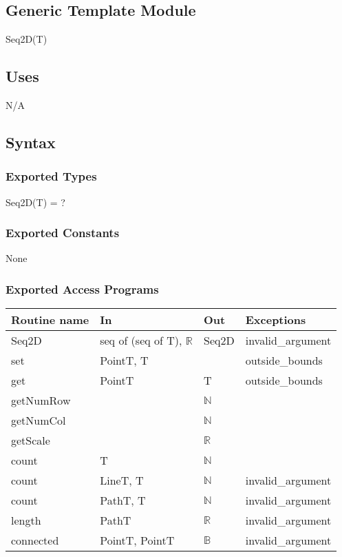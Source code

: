 \documentclass[12pt]{article}
\begin{document}
\subsection* {Generic Template Module}

Seq2D(T)

\subsection* {Uses}

N/A

\subsection* {Syntax}

\subsubsection* {Exported Types}

Seq2D(T) = ?

\subsubsection* {Exported Constants}

None

\subsubsection* {Exported Access Programs}

\begin{tabular}{| l | l | l | p{5cm} |}
\hline
\textbf{Routine name} & \textbf{In} & \textbf{Out} & \textbf{Exceptions}\\
\hline
Seq2D & seq of (seq of T), $\mathbb{R}$ & Seq2D & invalid\_argument\\
\hline
set & PointT, T & ~ & outside\_bounds\\
\hline
get & PointT & T & outside\_bounds\\
\hline
getNumRow & ~ & $\mathbb{N}$ & \\
\hline
getNumCol & ~ & $\mathbb{N}$ & \\
\hline
getScale & ~ & $\mathbb{R}$ & \\
\hline
count & T & $\mathbb{N}$ & \\
\hline
count & LineT, T & $\mathbb{N}$ & invalid\_argument\\
\hline
count & PathT, T & $\mathbb{N}$ & invalid\_argument\\
\hline
length & PathT & $\mathbb{R}$ & invalid\_argument\\
\hline
connected & PointT, PointT & $\mathbb{B}$ & invalid\_argument\\
\hline
\end{tabular}
\end{document}
